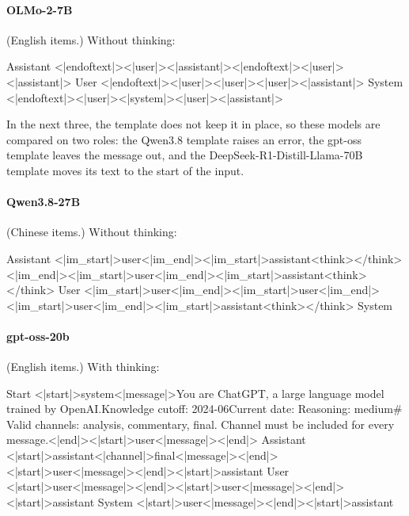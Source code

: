 \paragraph{OLMo-2-7B} (English items.)
\noindent Without thinking:
\begin{Rendering}
Assistant  <|endoftext|><|user|>\NL{}\NL{}<|assistant|>\NL{}<|endoftext|>\NL{}<|user|>\NL{}\NL{}<|assistant|>\NL{}
User       <|endoftext|><|user|>\NL{}\NL{}<|user|>\NL{}\NL{}<|user|>\NL{}\NL{}<|assistant|>\NL{}
System     <|endoftext|><|user|>\NL{}\NL{}<|system|>\NL{}\NL{}<|user|>\NL{}\NL{}<|assistant|>\NL{}
\end{Rendering}

In the next three, the template does not keep it in place, so these models are compared on two roles: the Qwen3.8 template raises an error, the gpt-oss template leaves the message out, and the DeepSeek-R1-Distill-Llama-70B template moves its text to the start of the input.

\paragraph{Qwen3.8-27B} (Chinese items.)
\noindent Without thinking:
\begin{Rendering}
Assistant  <|im_start|>user\NL{}<|im_end|>\NL{}<|im_start|>assistant\NL{}<think>\NL{}\NL{}</think>\NL{}\NL{}<|im_end|>\NL{}<|im_start|>user\NL{}<|im_end|>\NL{}<|im_start|>assistant\NL{}<think>\NL{}\NL{}</think>\NL{}\NL{}
User       <|im_start|>user\NL{}<|im_end|>\NL{}<|im_start|>user\NL{}<|im_end|>\NL{}<|im_start|>user\NL{}<|im_end|>\NL{}<|im_start|>assistant\NL{}<think>\NL{}\NL{}</think>\NL{}\NL{}
System     
\end{Rendering}
\paragraph{gpt-oss-20b} (English items.)
\noindent With thinking:
\begin{Rendering}
Start      <|start|>system<|message|>You are ChatGPT, a large language model trained by OpenAI.\NL{}Knowledge cutoff: 2024-06\NL{}Current date: \NL{}\NL{}Reasoning: medium\NL{}\NL{}# Valid channels: analysis, commentary, final. Channel must be included for every message.<|end|><|start|>user<|message|><|end|>
Assistant  <|start|>assistant<|channel|>final<|message|><|end|><|start|>user<|message|><|end|><|start|>assistant
User       <|start|>user<|message|><|end|><|start|>user<|message|><|end|><|start|>assistant
System      <|start|>user<|message|><|end|><|start|>assistant
\end{Rendering}
